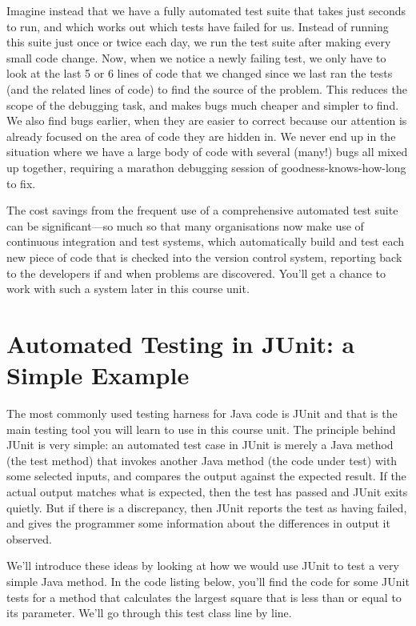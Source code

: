\documentclass[
]{book}
\begin{document}
Imagine instead that we have a fully automated test suite that takes just seconds to run, and which works out which tests have failed for us. Instead of running this suite just once or twice each day, we run the test suite after making every small code change. Now, when we notice a newly failing test, we only have to look at the last 5 or 6 lines of code that we changed since we last ran the tests (and the related lines of code) to find the source of the problem. This reduces the scope of the debugging task, and makes bugs much cheaper and simpler to find. We also find bugs earlier, when they are easier to correct because our attention is already focused on the area of code they are hidden in. We never end up in the situation where we have a large body of code with several (many!) bugs all mixed up together, requiring a marathon debugging session of goodness-knows-how-long to fix.

The cost savings from the frequent use of a comprehensive automated test suite can be significant---so much so that many organisations now make use of continuous integration and test systems, which automatically build and test each new piece of code that is checked into the version control system, reporting back to the developers if and when problems are discovered. You'll get a chance to work with such a system later in this course unit.

\hypertarget{simpleg}{%
\section{Automated Testing in JUnit: a Simple Example}\label{simpleg}}

The most commonly used testing harness for Java code is JUnit and that is the main testing tool you will learn to use in this course unit. The principle behind JUnit is very simple: an automated test case in JUnit is merely a Java method (the test method) that invokes another Java method (the code under test) with some selected inputs, and compares the output against the expected result. If the actual output matches what is expected, then the test has passed and JUnit exits quietly. But if there is a discrepancy, then JUnit reports the test as having failed, and gives the programmer some information about the differences in output it observed.

We'll introduce these ideas by looking at how we would use JUnit to test a very simple Java method. In the code listing below, you'll find the code for some JUnit tests for a method that calculates the largest square that is less than or equal to its parameter. We'll go through this test class line by line.
\end{document}
